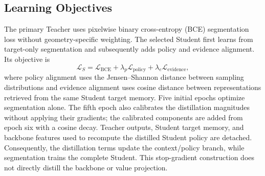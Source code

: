 \subsection{Learning Objectives}
The primary Teacher uses pixelwise binary cross-entropy (BCE) segmentation loss without geometry-specific weighting. The selected Student first learns from target-only segmentation and subsequently adds policy and evidence alignment. Its objective is
\begin{equation}
\mathcal{L}_S=\mathcal{L}_{\mathrm{BCE}}+
\lambda_p\mathcal{L}_{\mathrm{policy}}+
\lambda_e\mathcal{L}_{\mathrm{evidence}},
\label{eq:student_loss}
\end{equation}
where policy alignment uses the Jensen--Shannon distance between sampling distributions and evidence alignment uses cosine distance between representations retrieved from the same Student target memory. Five initial epochs optimize segmentation alone. The fifth epoch also calibrates the distillation magnitudes without applying their gradients; the calibrated components are added from epoch six with a cosine decay. Teacher outputs, Student target memory, and backbone features used to recompute the distilled Student policy are detached. Consequently, the distillation terms update the context/policy branch, while segmentation trains the complete Student. This stop-gradient construction does not directly distill the backbone or value projection.
